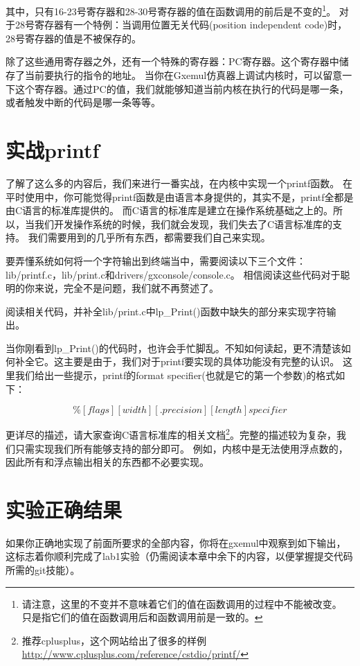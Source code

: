 其中，只有16-23号寄存器和28-30号寄存器的值在函数调用的前后是不变的\footnote{请注意，这里的不变并不意味着它们的值在函数调用的过程中不能被改变。
只是指它们的值在函数调用后和函数调用前是一致的。}。
对于28号寄存器有一个特例：当调用位置无关代码(position independent code)时，28号寄存器的值是不被保存的。

除了这些通用寄存器之外，还有一个特殊的寄存器：PC寄存器。这个寄存器中储存了当前要执行的指令的地址。
当你在Gxemul仿真器上调试内核时，可以留意一下这个寄存器。通过PC的值，我们就能够知道当前内核在执行的代码是哪一条，
或者触发中断的代码是哪一条等等。

\section{实战printf}
了解了这么多的内容后，我们来进行一番实战，在内核中实现一个printf函数。
在平时使用中，你可能觉得printf函数是由语言本身提供的，其实不是，printf全都是由C语言的标准库提供的。
而C语言的标准库是建立在操作系统基础之上的。所以，当我们开发操作系统的时候，我们就会发现，我们失去了C语言标准库的支持。
我们需要用到的几乎所有东西，都需要我们自己来实现。

要弄懂系统如何将一个字符输出到终端当中，需要阅读以下三个文件：lib/printf.c，lib/print.c和drivers/gxconsole/console.c。
相信阅读这些代码对于聪明的你来说，完全不是问题，我们就不再赘述了。

\begin{exercise}
阅读相关代码，并补全lib/print.c中lp\_Print()函数中缺失的部分来实现字符输出。
\end{exercise}

当你刚看到lp\_Print()的代码时，也许会手忙脚乱。不知如何读起，更不清楚该如何补全它。这主要是由于，我们对于printf要实现的具体功能没有完整的认识。
这里我们给出一些提示，printf的format specifier(也就是它的第一个参数)的格式如下：

\begin{equation*}
  \%[flags][width][.precision][length]specifier 
\end{equation*}

更详尽的描述，请大家查询C语言标准库的相关文档\footnote{推荐cplusplus，这个网站给出了很多的样例
\url{http://www.cplusplus.com/reference/cstdio/printf/}}。完整的描述较为复杂，我们只需实现我们所有能够支持的部分即可。
例如，内核中是无法使用浮点数的，因此所有和浮点输出相关的东西都不必要实现。

\section{实验正确结果}
如果你正确地实现了前面所要求的全部内容，你将在gxemul中观察到如下输出，这标志着你顺利完成了lab1实验（仍需阅读本章中余下的内容，以便掌握提交代码所需的git技能）。

